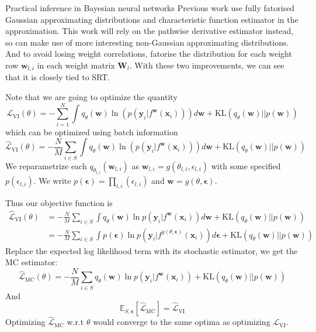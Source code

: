 \documentclass{beamer}
\begin{document}
\begin{frame}[allowframebreaks]{Practical inference in Bayesian neural networks}
Previous work use fully fatorised Gaussian approximating distributions and characteristic function estimator in the approximation. This work will rely on the pathwise derivative estimator instead, so can make use of more interesting non-Gaussian approximating distributions. And to avoid losing weight correlations, fatorise the distribution for each weight row $\mathbf{w}_{l,i}$ in each weight matrix $\mathbf{W}_l$. With these two improvements, we can see that it is closely tied to SRT.

\framebreak

Note that we are going to optimize the quantity
$$\mathcal{L}_{\text{VI}} (\theta) = - \sum_{i=1}^N \int q_\theta(\mathbf{w}) \ln (p(\mathbf{y}_i | f^\mathbf{w} (\mathbf{x}_i))) d\mathbf{w} + \text{KL}(q_\theta(\mathbf{w}) || p(\mathbf{w}))$$
which can be optimized using batch information
$$\hat{\mathcal{L}}_{\text{VI}} (\theta) = - \frac{N}{M}\sum_{i\in S} \int q_\theta(\mathbf{w}) \ln (p(\mathbf{y}_i | f^\mathbf{w} (\mathbf{x}_i))) d\mathbf{w} + \text{KL}(q_\theta(\mathbf{w}) || p(\mathbf{w}))$$
We reparametrize each $q_{\theta_{l,i}}(\mathbf{w}_{l,i})$ as $\bm{w}_{l,i} = g(\theta_{l,i}, \epsilon_{l,i})$ with some specified $p(\epsilon_{l,i})$. We write $p(\bm{\epsilon}) = \prod_{l,i}(\epsilon_{l,i})$ and $\mathbf{w} = g(\theta, \bm{\epsilon})$. 

\framebreak

Thus our objective function is 
\begin{align*}
\hat{\mathcal{L}}_{\text{VI}} (\theta) & = - \frac{N}{M}\sum_{i\in S} \int q_\theta(\mathbf{w}) \ln p(\mathbf{y}_i | f^\mathbf{w} (\mathbf{x}_i)) d\mathbf{w} + \text{KL}(q_\theta(\mathbf{w}) || p(\mathbf{w})) \\
& = - \frac{N}{M}\sum_{i\in S} \int p(\bm{\epsilon}) \ln p(\mathbf{y}_i | f^{g(\theta, \bm{\epsilon})} (\mathbf{x}_i)) d\bm{\epsilon} + \text{KL}(q_\theta(\mathbf{w}) || p(\mathbf{w}))
\end{align*}
Replace the expected log likelihood term with its stochastic estimator, we get the MC estimator:
$$\hat{\mathcal{L}}_{\text{MC}} (\theta)  = - \frac{N}{M}\sum_{i\in S}  q_\theta(\mathbf{w}) \ln p(\mathbf{y}_i | f^\mathbf{w} (\mathbf{x}_i)) + \text{KL}(q_\theta(\mathbf{w}) || p(\mathbf{w}))$$
And 
$$\mathbb{E}_{S, \bm{\epsilon}} [\hat{\mathcal{L}}_{\text{MC}}] = \hat{\mathcal{L}}_{\text{VI}}$$
Optimizing $\hat{\mathcal{L}}_{\text{MC}}$ w.r.t $\theta$ would converge to the same optima as optimizing $\mathcal{L}_{\text{VI}}$.


\end{frame}
\end{document}
